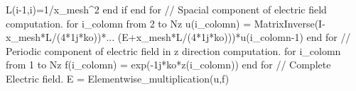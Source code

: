 \documentclass[a4paper]{article}
\begin{document}
{		\indent\indent L(i-1,i)=1/x\_mesh\string^2\newline
		\indent end if\newline
		end for\newline\newline	
		\textcolor{OliveGreen}{// Spacial component of electric field computation.}\newline
		for i\_colomn from 2 to Nz\newline
		\indent u(i\_colomn) = MatrixInverse(I-x\_mesh*L/(4*1j*ko))*...\newline
		\indent\indent\indent\indent\indent\indent\indent\indent\indent\indent\indent(E+x\_mesh*L/(4*1j*ko)))*u(i\_colomn-1)\newline
		end for\newline\newline
		\textcolor{OliveGreen}{// Periodic component of electric field in z direction computation.}\newline
		for i\_colomn from 1 to Nz\newline
		\indent f(i\_colomn) = exp(-1j*ko*z(i\_colomn))\newline
		end for\newline\newline
		\textcolor{OliveGreen}{// Complete Electric field.}\newline
		E = Elementwise\_multiplication(u,f)\newline\newline
	    }
		\newpage

	
		
\end{document}
